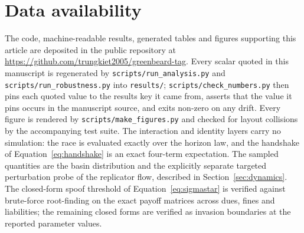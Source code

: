 \section*{Data availability}

\begin{sloppypar}
The code, machine-readable results, generated tables and figures supporting
this article are deposited in the public repository at
\url{https://github.com/trungkiet2005/greenbeard-tag}. Every scalar quoted in
this manuscript is regenerated by \texttt{scripts/run\_analysis.py} and
\texttt{scripts/run\_robustness.py} into \texttt{results/};
\texttt{scripts/check\_numbers.py} then pins each quoted value to the results
key it came from, asserts that the value it pins occurs in the manuscript
source, and exits non-zero on any drift. Every figure is rendered by
\texttt{scripts/make\_figures.py} and checked for layout collisions by the
accompanying test suite. The interaction and identity layers carry no
simulation: the race is evaluated exactly over the horizon law, and the
handshake of Equation~\eqref{eq:handshake} is an exact four-term expectation.
The sampled quantities are the basin distribution and the explicitly separate
targeted perturbation probe of the replicator flow, described in
Section~\ref{sec:dynamics}. The closed-form spoof threshold of
Equation~\eqref{eq:sigmastar} is verified against brute-force root-finding on
the exact payoff matrices across dues, fines and liabilities; the remaining
closed forms are verified as invasion boundaries at the reported parameter
values.
\end{sloppypar}

